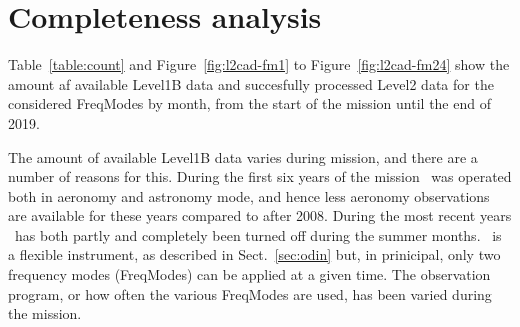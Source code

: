 \chapter{Completeness analysis}
\label{chapter:cad}

\begin{table}
\caption{ \smr\ Level1B and Level2 data count by frequency mode.}
\label{table:count}
\end{table}


Table~\ref{table:count} and Figure~\ref{fig:l2cad-fm1} to
Figure~\ref{fig:l2cad-fm24} show the amount af available Level1B
data and succesfully processed Level2 data for the considered
FreqModes by month, from the start of the mission until the
end of 2019.

The amount of available Level1B data varies during mission,
and there are a number of reasons for this.
During the first six years of the mission \smr\ was operated
both in aeronomy and astronomy mode, and hence less
aeronomy observations are available for these years
compared to after 2008.  
During the most recent years \smr\ has both partly and completely
been turned off during the summer months.
\smr\ is a flexible instrument, as described in Sect.~\ref{sec:odin}
but, in prinicipal, only two frequency modes (FreqModes)
can be applied at a given time. The observation program, or how
often the various FreqModes are used, has been varied during the
mission.

